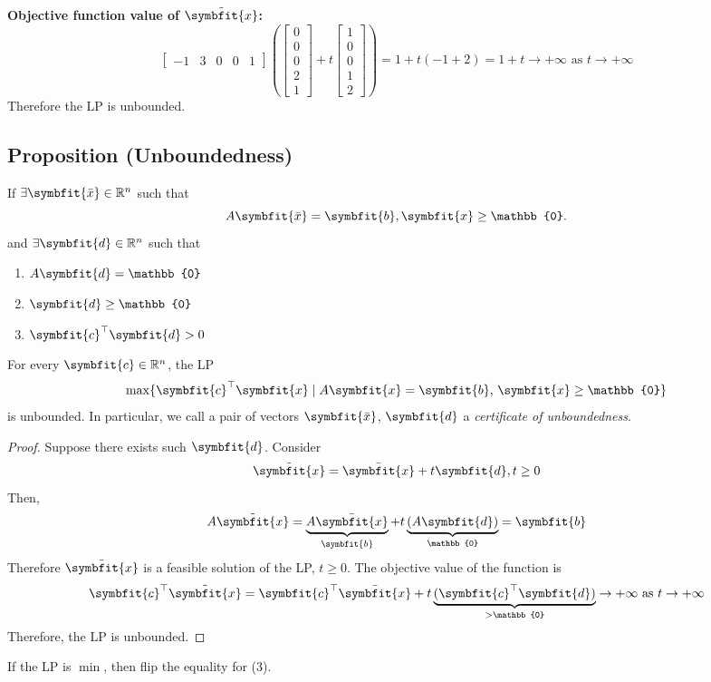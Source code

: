 \textbf{Objective function value of $\tilde{\symbfit{x}}$:}
\[
\begin{bmatrix}
    -1 & 3 & 0 & 0 & 1
\end{bmatrix}
\left(\begin{bmatrix}
    0\\
    0\\
    0\\
    2\\
    1  
\end{bmatrix}
+
t
\begin{bmatrix}
    1\\
    0\\
    0\\
    1\\
    2
\end{bmatrix}\right)
=
1+t(-1+2)=1+t\rightarrow+\infty \text{ as }t\rightarrow+\infty\]
Therefore the LP is unbounded.


\begin{thmbox}
    \subsection{Proposition (Unboundedness)}
    If $\exists \symbfit{\bar{x}}\in\mathbb{R}^n$ such that
    \[A\symbfit{\bar{x}}=\symbfit{b}, \symbfit{x}\ge \mathbb{0}.\]
    and $\exists\symbfit{d}\in\mathbb{R}^n$ such that
    \begin{enumerate}[(1)]
        \item $A\symbfit{d}=\mathbb{0}$
        \item $\symbfit{d}\ge \mathbb{0}$
        \item $\symbfit{c}^\top \symbfit{d}>0$
    \end{enumerate}
    For every $\symbfit{c}\in\mathbb{R}^n$, the LP
    \[\max \{\symbfit{c}^\top \symbfit{x} \mid A\symbfit{x}=\symbfit{b}\text{, }
    \symbfit{x}\ge\mathbb{0}\}\]
    is unbounded. In particular, we call a pair of vectors $\symbfit{\bar{x}}$, $\symbfit{d}$ a
    \emph{certificate of unboundedness}.
\end{thmbox}

\begin{proof}
    Suppose there exists such $\symbfit{d}$. Consider
    \[\tilde{\symbfit{x}}=\bar{\symbfit{x}}+t\symbfit{d}, t\ge 0\]
Then,
\[A\tilde{\symbfit{x}}=
\underbrace{A\bar{\symbfit{x}}}_{\symbfit{b}}+
t\underbrace{(A\symbfit{d})}_{\mathbb{0}}=\symbfit{b}\]
Therefore $\tilde{\symbfit{x}}$ is a feasible solution of the LP, $t\ge 0$.
The objective value of the function is
\[\symbfit{c}^\top \tilde{\symbfit{x}}=\symbfit{c}^\top \bar{\symbfit{x}}+t
\underbrace{(\symbfit{c}^\top \symbfit{d})}_{>\mathbb{0}}\rightarrow +\infty\text{ as }t\rightarrow+\infty\]
Therefore, the LP is unbounded.
\end{proof}
\begin{remark}
    If the LP is $\min$, then flip the equality for (3).
\end{remark}

